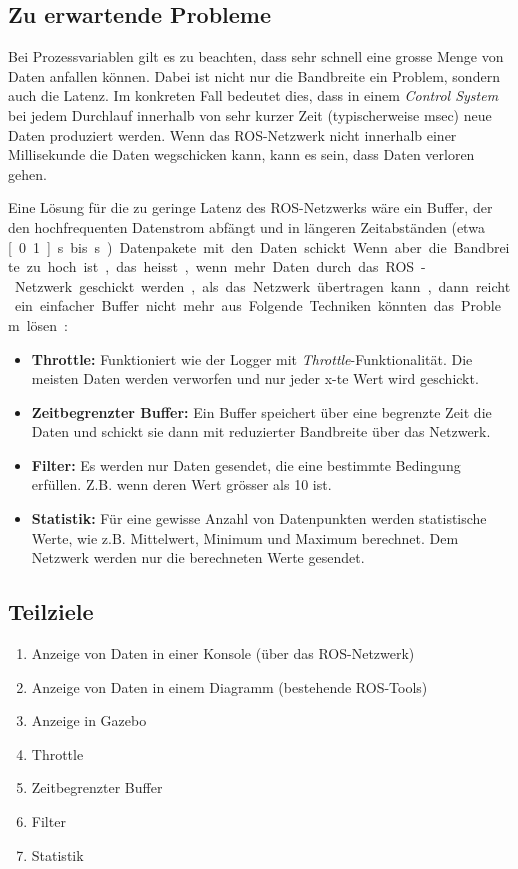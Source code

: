 \subsection{Zu erwartende Probleme}
Bei Prozessvariablen gilt es zu beachten, dass sehr schnell eine grosse Menge von Daten anfallen können.
Dabei ist nicht nur die Bandbreite ein Problem, sondern auch die Latenz.
Im konkreten Fall bedeutet dies, dass in einem \textit{Control System} bei jedem Durchlauf innerhalb von sehr kurzer Zeit (typischerweise \unit[1]{msec}) neue Daten produziert werden.
Wenn das ROS-Netzwerk nicht innerhalb einer Millisekunde die Daten wegschicken kann, kann es sein, dass Daten verloren gehen.

Eine Lösung für die zu geringe Latenz des ROS-Netzwerks wäre ein Buffer, der den hochfrequenten Datenstrom abfängt und in längeren Zeitabständen (etwa \unit[0.1]{s} bis \unit[1]{s}) Datenpakete mit den Daten schickt.


Wenn aber die Bandbreite zu hoch ist, das heisst, wenn mehr Daten durch das ROS-Netzwerk geschickt werden, als das Netzwerk übertragen kann, dann reicht ein einfacher Buffer nicht mehr aus.
Folgende Techniken könnten das Problem lösen:
\begin{itemize}
\item \textbf{Throttle:} Funktioniert wie der Logger mit \textit{Throttle}-Funktionalität. Die meisten Daten werden verworfen und nur jeder x-te Wert wird geschickt.
\item \textbf{Zeitbegrenzter Buffer:} Ein Buffer speichert über eine begrenzte Zeit die Daten und schickt sie dann mit reduzierter Bandbreite über das Netzwerk.
\item \textbf{Filter:} Es werden nur Daten gesendet, die eine bestimmte Bedingung erfüllen. Z.B. wenn deren Wert grösser als 10 ist.
\item \textbf{Statistik:} Für eine gewisse Anzahl von Datenpunkten werden statistische Werte, wie z.B. Mittelwert, Minimum und Maximum berechnet. Dem Netzwerk werden nur die berechneten Werte gesendet.
\end{itemize}

\subsection{Teilziele}
\begin{enumerate}
\item Anzeige von Daten in einer Konsole (über das ROS-Netzwerk)
\item Anzeige von Daten in einem Diagramm (bestehende ROS-Tools)
\item Anzeige in Gazebo
\item Throttle
\item Zeitbegrenzter Buffer
\item Filter
\item Statistik
\end{enumerate}


